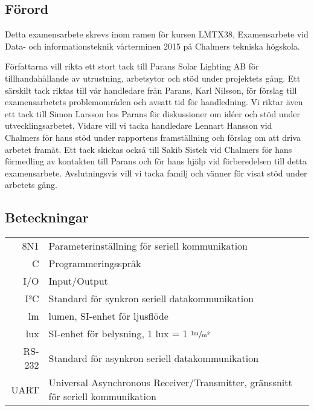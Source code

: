 \newpage
\subsection*{Förord} %
\label{sub:f_rord}
    Detta examensarbete skrevs inom ramen för kursen LMTX38, Examensarbete vid Data- och informationsteknik vårterminen 2015 på Chalmers tekniska högskola. \bigskip

    Författarna vill rikta ett stort tack till Parans Solar Lighting AB för tillhandahållande av utrustning, arbetsytor och stöd under projektets gång. Ett särskilt tack riktas till vår handledare från Parans, Karl Nilsson, för förslag till examensarbetets problemområden och avsatt tid för handledning. Vi riktar även ett tack till Simon Larsson hos Parans för diskussioner om idéer och stöd under utvecklingsarbetet. Vidare vill vi tacka handledare Lennart Hansson vid Chalmers för hans stöd under rapportens framställning och förslag om att driva arbetet framåt. Ett tack skickas också till Sakib Sistek vid Chalmers för hans förmedling av kontakten till Parans och för hans hjälp vid förberedelsen till detta examensarbete. Avslutningsvis vill vi tacka familj och vänner för visat stöd under arbetets gång.


\newpage

\subsection*{Beteckningar} %
\label{sub:beteckningar}
    \begin{tabularx}{\textwidth}{@{}rX}
        8N1 & Parameterinställning för seriell kommunikation \\
        C & Programmeringsspråk \\
        I/O & Input/Output \\
        I²C & Standard för synkron seriell datakommunikation \\
        lm & lumen, SI-enhet för ljusflöde \\
        lux & SI-enhet för belysning, 1 lux = 1 $\sfrac{\text{lm}}{\text{m}^2}$ \\
        RS-232 & Standard för asynkron seriell datakommunikation \\
        UART & Universal Asynchronous Receiver/Transmitter, \newline gränssnitt för seriell kommunikation
        
    \end{tabularx}
